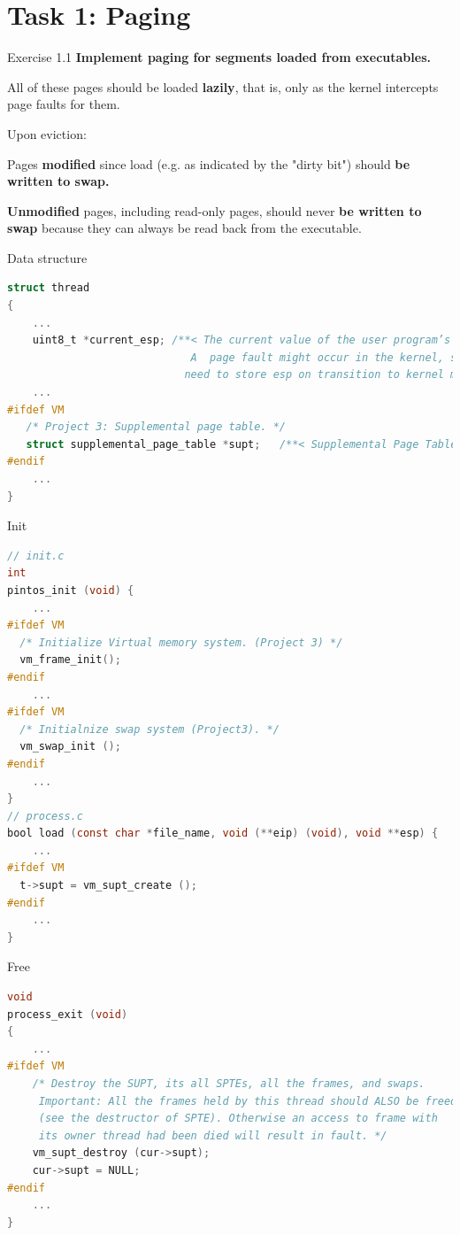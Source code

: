 \documentclass[10pt]{beamer}
\begin{document}
\section{Task 1: Paging}
\begin{frame}[fragile]{Exercise 1.1}
    \textbf{Implement paging for segments loaded from executables.}

All of these pages should be loaded \textbf{lazily}, that is, only as the kernel intercepts page faults for them.

Upon eviction:

Pages \textbf{modified} since load (e.g. as indicated by the "dirty bit") should \textbf{be written to swap.}

\textbf{Unmodified} pages, including read-only pages, should never \textbf{be written to swap} because they can always be read back from the executable.
\end{frame}
\begin{frame}[fragile]{Data structure}
\begin{lstlisting}[language=C]
struct thread
{
    ...
    uint8_t *current_esp; /**< The current value of the user program’s stack pointer.
                             A  page fault might occur in the kernel, so we might
                            need to store esp on transition to kernel mode. (4.3.3) */
    ...
#ifdef VM
   /* Project 3: Supplemental page table. */
   struct supplemental_page_table *supt;   /**< Supplemental Page Table. */
#endif
    ...
}
\end{lstlisting}
\end{frame}
\begin{frame}[fragile]{Init}
\begin{lstlisting}[language=C]
// init.c
int
pintos_init (void) {
    ...
#ifdef VM
  /* Initialize Virtual memory system. (Project 3) */
  vm_frame_init();
#endif
    ...
#ifdef VM
  /* Initialnize swap system (Project3). */
  vm_swap_init ();
#endif
    ...
}
// process.c
bool load (const char *file_name, void (**eip) (void), void **esp) {
    ...
#ifdef VM
  t->supt = vm_supt_create ();
#endif
    ...
}
\end{lstlisting}
\end{frame}
\begin{frame}[fragile]{Free}
\begin{lstlisting}[language=C]
void
process_exit (void)
{
    ...
#ifdef VM
    /* Destroy the SUPT, its all SPTEs, all the frames, and swaps.
     Important: All the frames held by this thread should ALSO be freed
     (see the destructor of SPTE). Otherwise an access to frame with
     its owner thread had been died will result in fault. */
    vm_supt_destroy (cur->supt);
    cur->supt = NULL;
#endif
    ...
}
\end{lstlisting}
\end{frame}
\end{document}
